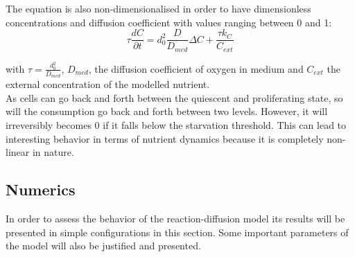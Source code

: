\documentclass[11pt,a4paper]{article}
\begin{document}



The equation is also non-dimensionalised in order to have dimensionless concentrations and diffusion coefficient with values ranging between 0 and 1:
\[  \tau \frac{d C}{\partial t}  =   d_0^2 \frac{D}{D_{med}} \Delta C + \frac{\tau k_C}{C_{ext}}  \]

 with $\tau  = \frac{d_0^2}{D_{med}}$, $D_{med}$, the diffusion coefficient of oxygen in medium and $C_{ext}$ the external concentration of the modelled nutrient.\\ %




As cells can go back and forth between the quiescent and proliferating state, so will the consumption go back and forth between two levels. However, it will irreversibly becomes 0 if it falls below the starvation threshold. This can lead to interesting behavior in terms of nutrient dynamics because it is completely non-linear in nature.\\

\subsection{Numerics}
In order to assess the behavior of the reaction-diffusion model its results will be presented in simple configurations in this section. Some important parameters of the model will also be justified and presented.\\
\end{document}
